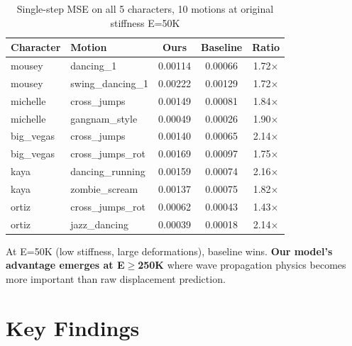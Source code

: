 \documentclass[10pt]{article}
\begin{document}
\begin{table}[h]
\centering
\caption{Single-step MSE on all 5 characters, 10 motions at original stiffness E=50K}
\small
\begin{tabular}{ll|cc|c}
\toprule
\textbf{Character} & \textbf{Motion} & \textbf{Ours} & \cellcolor{best}\textbf{Baseline} & \textbf{Ratio} \\
\midrule
mousey & dancing\_1 & 0.00114 & \cellcolor{best}0.00066 & 1.72$\times$ \\
mousey & swing\_dancing\_1 & 0.00222 & \cellcolor{best}0.00129 & 1.72$\times$ \\
michelle & cross\_jumps & 0.00149 & \cellcolor{best}0.00081 & 1.84$\times$ \\
michelle & gangnam\_style & 0.00049 & \cellcolor{best}0.00026 & 1.90$\times$ \\
big\_vegas & cross\_jumps & 0.00140 & \cellcolor{best}0.00065 & 2.14$\times$ \\
big\_vegas & cross\_jumps\_rot & 0.00169 & \cellcolor{best}0.00097 & 1.75$\times$ \\
kaya & dancing\_running & 0.00159 & \cellcolor{best}0.00074 & 2.16$\times$ \\
kaya & zombie\_scream & 0.00137 & \cellcolor{best}0.00075 & 1.82$\times$ \\
ortiz & cross\_jumps\_rot & 0.00062 & \cellcolor{best}0.00043 & 1.43$\times$ \\
ortiz & jazz\_dancing & 0.00039 & \cellcolor{best}0.00018 & 2.14$\times$ \\
\bottomrule
\end{tabular}
\end{table}

At E=50K (low stiffness, large deformations), baseline wins. \textbf{Our model's advantage emerges at E$\geq$250K} where wave propagation physics becomes more important than raw displacement prediction.

\section{Key Findings}
\end{document}
